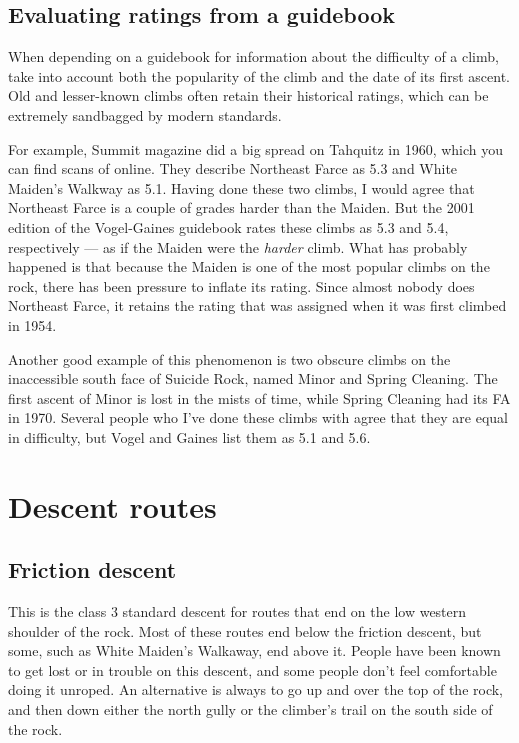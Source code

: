 \documentclass{tahquitz}
\begin{document}
\subsection{Evaluating ratings from a guidebook}

When depending on a guidebook for information about the difficulty of a climb, take
into account both the popularity of the climb and the date of its first ascent.
Old and lesser-known climbs often retain their historical ratings, which can be
extremely sandbagged by modern standards.

For example,
Summit magazine did a big spread on Tahquitz in 1960, which you can find scans of online.
They describe Northeast Farce as 5.3 and White Maiden's Walkway as 5.1. Having done
these two climbs, I would agree that Northeast Farce is a couple of grades harder
than the Maiden. But the 2001 edition
of the Vogel-Gaines guidebook rates these climbs as 5.3 and 5.4, respectively --- as if
the Maiden were the \emph{harder} climb. What has
probably happened is that because the Maiden is one of the most popular climbs on
the rock, there has been pressure to inflate its rating. Since almost nobody does Northeast
Farce, it retains the rating that was assigned when it was first climbed in 1954.

Another good example of this phenomenon is two obscure climbs on the inaccessible
south face of Suicide Rock, named Minor and Spring Cleaning. The first ascent of Minor is
lost in the mists of time, while Spring Cleaning had its FA in 1970. Several people who
I've done these climbs with agree that they are equal in difficulty, but Vogel and Gaines
list them as 5.1 and 5.6.

\pagebreak

\section{Descent routes}

\subsection{Friction descent}\label{subsec:friction-descent}

This is the class 3 standard descent for routes that end on the low western shoulder of the rock.
Most of these routes end below the friction descent, but some, such as White Maiden's Walkaway,
end above it. People have been known to get lost or in trouble on this descent, and some people
don't feel comfortable doing it unroped. An alternative is always to go up and over
the top of the rock, and then down either the north gully or the climber's trail on the
south side of the rock.
\end{document}
